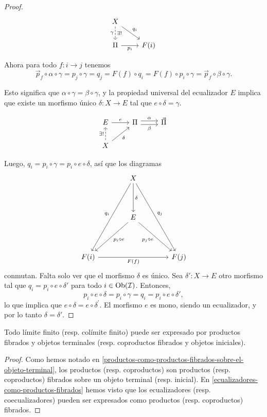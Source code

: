 \documentclass{article}
\numberwithin{equation}{section}
\theoremstyle{definition}
\begin{document}
\begin{proof}
  \[ \begin{tikzcd}
      X\ar[dashed]{d}[swap]{\gamma}{\exists !}\ar{dr}{q_i} \\
      \Pi \ar{r}[swap]{p_i} & F (i)
    \end{tikzcd} \]

  Ahora para todo $f\colon i\to j$ tenemos
  \[ \vec{p}_f\circ \alpha\circ \gamma =
     p_j\circ \gamma =
     q_j =
     F(f)\circ q_i =
     F(f)\circ p_i\circ\gamma =
     \vec{p}_f\circ\beta\circ\gamma. \]

  Esto significa que $\alpha\circ\gamma = \beta\circ\gamma$, y la propiedad
  universal del ecualizador $E$ implica que existe un morfismo único
  $\delta\colon X\to E$ tal que $e\circ \delta = \gamma$.

  \[ \begin{tikzcd}
      E\ar{r}{e} & \Pi\ar[shift left=0.25em]{r}{\alpha}\ar[shift right=0.25em]{r}[swap]{\beta} & \vec{\Pi} \\
      X\ar{ur}[swap]{\delta}\ar[dashed]{u}{\exists !}
    \end{tikzcd} \]

  Luego, $q_i = p_i\circ\gamma = p_i\circ e\circ\delta$, así que los diagramas
  \[ \begin{tikzcd}[row sep=4em, column sep=4em]
      & X \ar{ddl}[swap]{q_i}\ar{ddr}{q_j}\ar{d}{\delta} \\
      & E\ar{dl}{p_i\circ e}\ar{dr}[swap]{p_j\circ e} \\
      F (i)\ar{rr}[swap]{F (f)} & & F (j)
    \end{tikzcd} \]
  conmutan. Falta solo ver que el morfismo $\delta$ es único.
  Sea $\delta'\colon X\to E$ otro morfismo tal que
  $q_i = p_i\circ e \circ \delta'$ para todo $i\in \operatorname{Ob}(\mathcal{I})$.
  Entonces,
  $$p_i\circ e\circ\delta = p_i\circ\gamma = q_i = p_i\circ e\circ\delta',$$
  lo que implica que $e\circ\delta = e\circ\delta^\prime$. El morfismo $e$ es
  mono, siendo un ecualizador, y por lo tanto $\delta = \delta'$.
\end{proof}

\begin{corolario}
  Todo límite finito (resp. colímite finito) puede ser expresado por productos
  fibrados y objetos terminales (resp. coproductos fibrados y objetos
  iniciales).

  \begin{proof}
    Como hemos notado en
    \ref{productos-como-productos-fibrados-sobre-el-objeto-terminal},
    los productos (resp. coproductos) son productos (resp. coproductos) fibrados
    sobre un objeto terminal (resp. inicial).
    En \ref{ecualizadores-como-productos-fibrados} hemos visto que
    los ecualizadores (resp. coecualizadores) pueden ser expresados como
    productos (resp. coproductos) fibrados.
  \end{proof}
\end{corolario}
\end{document}
